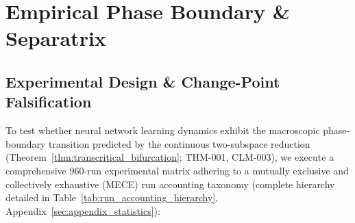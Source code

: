 \documentclass{article}
\theoremstyle{plain}
\theoremstyle{definition}
\begin{document}
\section{Empirical Phase Boundary \& Separatrix}
\label{sec:empirical_phase_boundary}

\subsection{Experimental Design \& Change-Point Falsification}
To test whether neural network learning dynamics exhibit the macroscopic phase-boundary transition predicted by the continuous two-subspace reduction (Theorem~\ref{thm:transcritical_bifurcation}; THM-001, CLM-003), we execute a comprehensive 960-run experimental matrix adhering to a mutually exclusive and collectively exhaustive (MECE) run accounting taxonomy (complete hierarchy detailed in Table~\ref{tab:run_accounting_hierarchy}, Appendix~\ref{sec:appendix_statistics}):
\end{document}
